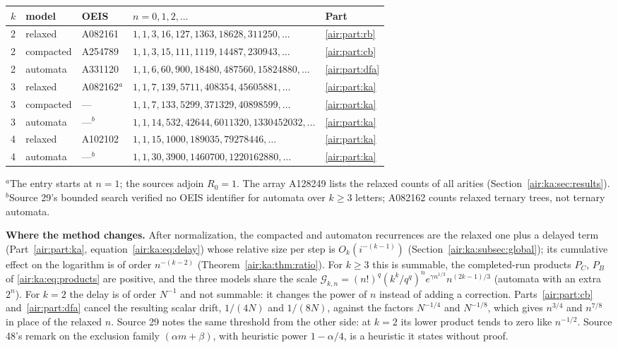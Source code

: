 \documentclass[11pt,letterpaper]{article}
\numberwithin{equation}{section}
\theoremstyle{remark}
\newcommand{\G}{\mathcal G}
\begin{document}
\begin{center}
\small
\begin{tabular}{@{}lllll@{}}
\toprule
$k$ & model & OEIS & $n=0,1,2,\ldots$ & Part\\
\midrule
2 & relaxed & A082161 & $1,1,3,16,127,1363,18628,311250,\ldots$ & \ref{air:part:rb}\\
2 & compacted & A254789 & $1,1,3,15,111,1119,14487,230943,\ldots$ & \ref{air:part:cb}\\
2 & automata & A331120 & $1,1,6,60,900,18480,487560,15824880,\ldots$ & \ref{air:part:dfa}\\
3 & relaxed & A082162$^{a}$ & $1,1,7,139,5711,408354,45605881,\ldots$ & \ref{air:part:ka}\\
3 & compacted & --- & $1,1,7,133,5299,371329,40898599,\ldots$ & \ref{air:part:ka}\\
3 & automata & ---$^{b}$ & $1,1,14,532,42644,6011320,1330452032,\ldots$ & \ref{air:part:ka}\\
4 & relaxed & A102102 & $1,1,15,1000,189035,79278446,\ldots$ & \ref{air:part:ka}\\
4 & automata & ---$^{b}$ & $1,1,30,3900,1460700,1220162880,\ldots$ & \ref{air:part:ka}\\
\bottomrule
\end{tabular}

\smallskip
\raggedright\footnotesize $^{a}$The entry starts at $n=1$; the sources adjoin $R_0=1$. The array A128249 lists the relaxed counts of all arities (Section~\ref{air:ka:sec:results}).\\
$^{b}$Source 29's bounded search verified no OEIS identifier for automata over $k\ge3$ letters; A082162 counts relaxed ternary trees, not ternary automata.
\end{center}

\textbf{Where the method changes.} After normalization, the compacted and automaton recurrences are the relaxed one plus a delayed term (Part~\ref{air:part:ka}, equation~\eqref{air:ka:eq:delay}) whose relative size per step is $O_k(i^{-(k-1)})$ (Section~\ref{air:ka:subsec:global}); its cumulative effect on the logarithm is of order $n^{-(k-2)}$ (Theorem~\ref{air:ka:thm:ratio}). For $k\ge3$ this is summable, the completed-run products $P_C$, $P_B$ of \eqref{air:ka:eq:products} are positive, and the three models share the scale $\G_{k,n}=(n!)^q(k^k/q^q)^ne^{\gamma n^{1/3}}n^{(2k-1)/3}$ (automata with an extra $2^n$). For $k=2$ the delay is of order $N^{-1}$ and not summable: it changes the power of $n$ instead of adding a correction. Parts~\ref{air:part:cb} and~\ref{air:part:dfa} cancel the resulting scalar drift, $1/(4N)$ and $1/(8N)$, against the factors $N^{-1/4}$ and $N^{-1/8}$, which gives $n^{3/4}$ and $n^{7/8}$ in place of the relaxed $n$. Source 29 notes the same threshold from the other side: at $k=2$ its lower product tends to zero like $n^{-1/2}$. Source 48's remark on the exclusion family $(\alpha m+\beta)$, with heuristic power $1-\alpha/4$, is a heuristic it states without proof.
\end{document}
